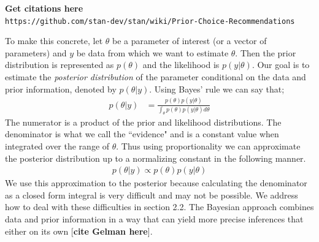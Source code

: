 \documentclass[12pt, oneside]{article}
\begin{document}
\begin{enumerate}
 \textbf{Get citations here}\\
 \texttt{https://github.com/stan-dev/stan/wiki/Prior-Choice-Recommendations}
 \end{enumerate}
  To make this concrete, let $\theta$ be a parameter of interest (or a vector of parameters) and $y$ be data from which we want to estimate $\theta$.  Then the prior distribution is represented as $p(\theta)$ and the likelihood is $p(y | \theta)$. Our goal is to estimate the \textit{posterior distribution} of the parameter conditional on the data and prior information, denoted by $p(\theta | y)$. Using Bayes' rule we can say that;
  \begin{align*}
  p(\theta|y) &= \frac{ p(\theta) p(y |\theta)}{\int_{\theta} p(\theta) p(y |\theta) d\theta}
  \end{align*}
  The numerator is a product of the prior and likelihood distributions. The denominator is what we call the ``evidence" and is a constant value when integrated over the range of $\theta$. Thus using proportionality we can approximate the posterior distribution up to a normalizing constant in the following manner.
   \begin{align*}
 p(\theta | y) \propto p(\theta) p(y |\theta)
 \end{align*}
 We use this approximation to the posterior because calculating the denominator as a closed form integral is very difficult and may not be possible. We address how to deal with these difficulties in section 2.2. The Bayesian approach combines data and prior information in a way that can yield more precise inferences that either on its own [\textbf{cite Gelman here}].
\end{document}
